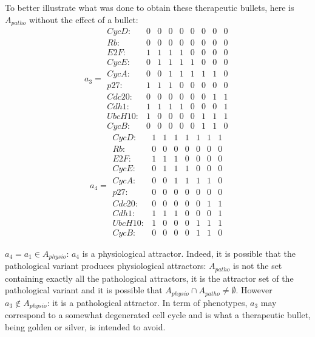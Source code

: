 \documentclass[oneside,a4paper,onecolumn,notitlepage]{article}
\begin{document}
To better illustrate what was done to obtain these therapeutic bullets, here is $A_{patho}$ without the effect of a bullet:
\begin{equation*}
a_{3}=
\begin{matrix}
CycD:&0&0&0&0&0&0&0&0\\
Rb:&0&0&0&0&0&0&0&0\\
E2F:&1&1&1&1&0&0&0&0\\
CycE:&0&1&1&1&1&0&0&0\\
CycA:&0&0&1&1&1&1&1&0\\
p27:&1&1&1&0&0&0&0&0\\
Cdc20:&0&0&0&0&0&0&1&1\\
Cdh1:&1&1&1&1&0&0&0&1\\
UbcH10:&1&0&0&0&0&1&1&1\\
CycB:&0&0&0&0&0&1&1&0
\end{matrix}
\end{equation*}
\begin{equation*}
a_{4}=
\begin{matrix}
CycD:&1&1&1&1&1&1&1\\
Rb:&0&0&0&0&0&0&0\\
E2F:&1&1&1&0&0&0&0\\
CycE:&0&1&1&1&0&0&0\\
CycA:&0&0&1&1&1&1&0\\
p27:&0&0&0&0&0&0&0\\
Cdc20:&0&0&0&0&0&1&1\\
Cdh1:&1&1&1&0&0&0&1\\
UbcH10:&1&0&0&0&1&1&1\\
CycB:&0&0&0&0&1&1&0
\end{matrix}
\end{equation*}

$a_{4}=a_{1}\in A_{physio}$: $a_{4}$ is a physiological attractor. Indeed, it is possible that the pathological variant produces physiological attractors: $A_{patho}$ is not the set containing exactly all the pathological attractors, it is the attractor set of the pathological variant and it is possible that $A_{physio}\cap A_{patho}\neq \emptyset$. However $a_3\notin A_{physio}$: it is a pathological attractor. In term of phenotypes, $a_3$ may correspond to a somewhat degenerated cell cycle and is what a therapeutic bullet, being golden or silver, is intended to avoid.
\end{document}

